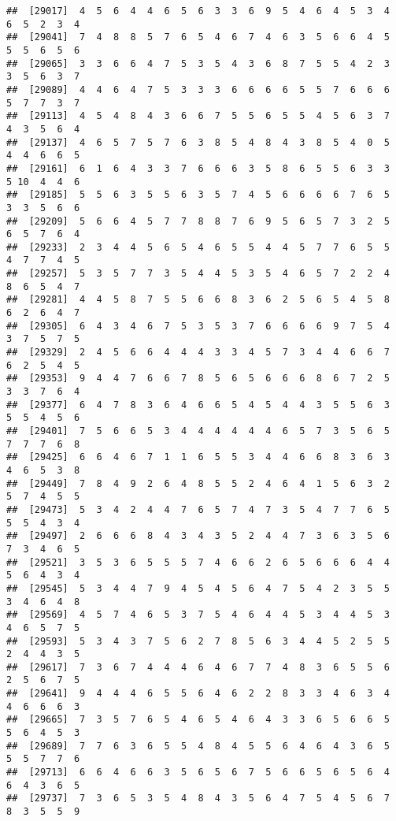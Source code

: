 \documentclass[
]{book}
\begin{document}
\begin{verbatim}
##  [29017]  4  5  6  4  4  6  5  6  3  3  6  9  5  4  6  4  5  3  4  6  5  2  3  4
##  [29041]  7  4  8  8  5  7  6  5  4  6  7  4  6  3  5  6  6  4  5  5  5  6  5  6
##  [29065]  3  3  6  6  4  7  5  3  5  4  3  6  8  7  5  5  4  2  3  3  5  6  3  7
##  [29089]  4  4  6  4  7  5  3  3  3  6  6  6  6  5  5  7  6  6  6  5  7  7  3  7
##  [29113]  4  5  4  8  4  3  6  6  7  5  5  6  5  5  4  5  6  3  7  4  3  5  6  4
##  [29137]  4  6  5  7  5  7  6  3  8  5  4  8  4  3  8  5  4  0  5  4  4  6  6  5
##  [29161]  6  1  6  4  3  3  7  6  6  6  3  5  8  6  5  5  6  3  3  5 10  4  4  6
##  [29185]  5  5  6  3  5  5  6  3  5  7  4  5  6  6  6  6  7  6  5  3  3  5  6  6
##  [29209]  5  6  6  4  5  7  7  8  8  7  6  9  5  6  5  7  3  2  5  6  5  7  6  4
##  [29233]  2  3  4  4  5  6  5  4  6  5  5  4  4  5  7  7  6  5  5  4  7  7  4  5
##  [29257]  5  3  5  7  7  3  5  4  4  5  3  5  4  6  5  7  2  2  4  8  6  5  4  7
##  [29281]  4  4  5  8  7  5  5  6  6  8  3  6  2  5  6  5  4  5  8  6  2  6  4  7
##  [29305]  6  4  3  4  6  7  5  3  5  3  7  6  6  6  6  9  7  5  4  3  7  5  7  5
##  [29329]  2  4  5  6  6  4  4  4  3  3  4  5  7  3  4  4  6  6  7  6  2  5  4  5
##  [29353]  9  4  4  7  6  6  7  8  5  6  5  6  6  6  8  6  7  2  5  3  3  7  6  4
##  [29377]  6  4  7  8  3  6  4  6  6  5  4  5  4  4  3  5  5  6  3  5  5  4  5  6
##  [29401]  7  5  6  6  5  3  4  4  4  4  4  4  6  5  7  3  5  6  5  7  7  7  6  8
##  [29425]  6  6  4  6  7  1  1  6  5  5  3  4  4  6  6  8  3  6  3  4  6  5  3  8
##  [29449]  7  8  4  9  2  6  4  8  5  5  2  4  6  4  1  5  6  3  2  5  7  4  5  5
##  [29473]  5  3  4  2  4  4  7  6  5  7  4  7  3  5  4  7  7  6  5  5  5  4  3  4
##  [29497]  2  6  6  6  8  4  3  4  3  5  2  4  4  7  3  6  3  5  6  7  3  4  6  5
##  [29521]  3  5  3  6  5  5  5  7  4  6  6  2  6  5  6  6  6  4  4  5  6  4  3  4
##  [29545]  5  3  4  4  7  9  4  5  4  5  6  4  7  5  4  2  3  5  5  3  4  6  4  8
##  [29569]  4  5  7  4  6  5  3  7  5  4  6  4  4  5  3  4  4  5  3  4  6  5  7  5
##  [29593]  5  3  4  3  7  5  6  2  7  8  5  6  3  4  4  5  2  5  5  2  4  4  3  5
##  [29617]  7  3  6  7  4  4  4  6  4  6  7  7  4  8  3  6  5  5  6  2  5  6  7  5
##  [29641]  9  4  4  4  6  5  5  6  4  6  2  2  8  3  3  4  6  3  4  4  6  6  6  3
##  [29665]  7  3  5  7  6  5  4  6  5  4  6  4  3  3  6  5  6  6  5  5  6  4  5  3
##  [29689]  7  7  6  3  6  5  5  4  8  4  5  5  6  4  6  4  3  6  5  5  5  7  7  6
##  [29713]  6  6  4  6  6  3  5  6  5  6  7  5  6  6  5  6  5  6  4  6  4  3  6  5
##  [29737]  7  3  6  5  3  5  4  8  4  3  5  6  4  7  5  4  5  6  7  8  3  5  5  9

\end{verbatim}
\end{document}
